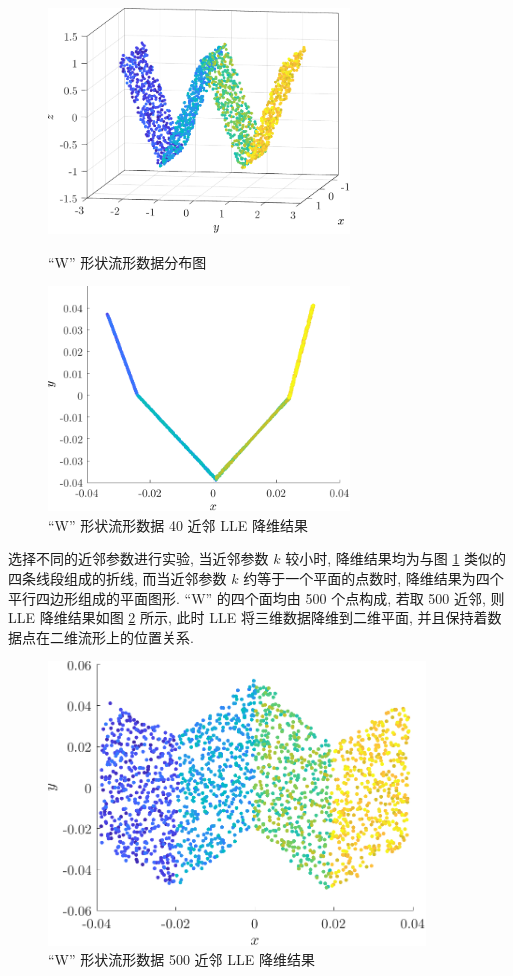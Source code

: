 \documentclass{article}
\begin{document}
\begin{figure}[htbp]
  \centering
  \begin{minipage}[t]{0.48\textwidth}
    \centering
    \includegraphics[width=8cm]{manifoldW.pdf}
    \caption{``W'' 形状流形数据分布图}
    \label{fig:manifoldW}
  \end{minipage}
  \begin{minipage}[t]{0.48\textwidth}
    \centering
    \includegraphics[width=8cm]{reducedW.pdf}
    \caption{``W'' 形状流形数据 40 近邻 LLE 降维结果}
    \label{fig:reducedW}
  \end{minipage}
\end{figure}

选择不同的近邻参数进行实验, 当近邻参数 $k$ 较小时, 降维结果均为与图 \ref{fig:reducedW} 类似的四条线段组成的折线, 而当近邻参数 $k$ 约等于一个平面的点数时, 降维结果为四个平行四边形组成的平面图形. ``W'' 的四个面均由 500 个点构成, 若取 500 近邻, 则 LLE 降维结果如图 \ref{fig:reducedW500} 所示, 此时 LLE 将三维数据降维到二维平面, 并且保持着数据点在二维流形上的位置关系.

\begin{figure}[htbp]
  \centering
  \includegraphics[width=10cm]{reducedW500.pdf}
  \caption{``W'' 形状流形数据 500 近邻 LLE 降维结果}
  \label{fig:reducedW500}
\end{figure}
\end{document}
